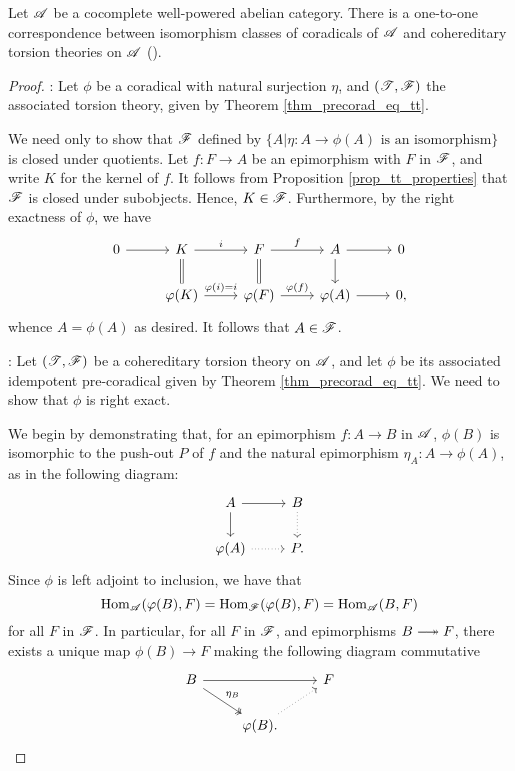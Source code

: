 \begin{thm}\label{thm_corad_equiv_htt}
Let $\mathscr{A}$ be a cocomplete well-powered abelian category.
There is a one-to-one correspondence between isomorphism 
classes of coradicals of $\mathscr{A}$ and cohereditary torsion 
theories on $\mathscr{A}$ (\CF \cite[I2.12]{BJV}).
\end{thm}
\begin{proof}

 : Let 
$\phi$ be a coradical with natural surjection $\eta$, and 
$(\mathscr{T}, \mathscr{F})$ the associated torsion theory, given by 
Theorem \ref{thm_precorad_eq_tt}.

We need only to show that $\mathscr{F}$ defined by $\{A | \eta: A \to 
\phi(A) \textrm{ is an isomorphism}\}$ is closed under quotients.
Let $f: F \to A$ be an epimorphism with $F$ in $\mathscr{F}$,
and write $K$ for the kernel of $f$. It follows from Proposition
\ref{prop_tt_properties} that $\mathscr{F}$ is closed under 
subobjects. Hence, $K \in \mathscr{F}$. Furthermore, by the right 
exactness of $\phi$, we have
\[
\begin{tikzcd}
0 \arrow{r} & 
K \arrow{r}{i} \arrow[equals]{d} &
F \arrow{r}{f} \arrow[equals]{d} &
A \arrow{r} \arrow{d} &
0 \\
& \phi(K) \arrow{r}{\phi(i) = i} &
\phi(F) \arrow{r}{\phi(f)} &
\phi(A) \arrow{r} &
0,
\end{tikzcd}
\]
whence $A = \phi(A)$ as desired. It follows that $A \in \mathscr{F}$.

 : Let
$(\mathscr{T}, \mathscr{F})$ be a cohereditary torsion theory on $\mathscr{A}$,
and let $\phi$ be its associated idempotent pre-coradical given by 
Theorem \ref{thm_precorad_eq_tt}. We need to show that $\phi$ is right 
exact.

We begin by demonstrating that, for an epimorphism $f: A \to B$ in
$\mathscr{A}$, $\phi(B)$ is isomorphic to the push-out $P$ of $f$ and the
natural epimorphism $\eta_A: A \to \phi(A)$, as in the following
diagram:
\[
\begin{tikzcd}
A \arrow{r} \arrow{d} & B \arrow[dotted]{d}\\
\phi(A) \arrow[dotted]{r} & P.
\end{tikzcd}
\]
Since $\phi$ is left adjoint to inclusion, we have that
\[
\mathrm{Hom}_{\mathscr{A}}(\varphi(B), F) = \mathrm{Hom}_{\mathscr{F}}(\varphi(B), F) = 
   \mathrm{Hom}_{\mathscr{A}}(B, F)
\]
for all $F$ in $\mathscr{F}$. In particular, for all $F$ in $\mathscr{F}$, 
and epimorphisms $B \onto F$, there exists a unique map $\phi(B) 
\to F$ making the following diagram commutative
\[
\begin{tikzcd}
B \arrow[twoheadrightarrow]{rd}{\eta_B} \arrow{rr} & & F \\
&\phi(B) \arrow[dotted]{ru}.
\end{tikzcd}
\]


\end{proof}

